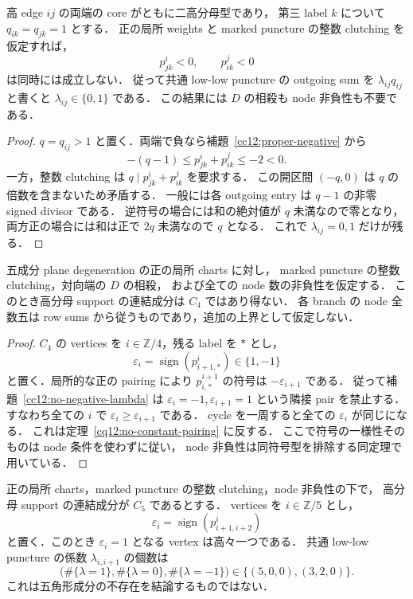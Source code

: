 \begin{lemma}
\label{cc12:no-negative-lambda}
高 edge $ij$ の両端の core がともに二高分母型であり，
第三 label $k$ について $q_{ik}=q_{jk}=1$ とする．
正の局所 weights と marked puncture の整数 clutching を仮定すれば，
\[
 p^i_{jk}<0,\qquad p^j_{ik}<0
\]
は同時には成立しない．
従って共通 low-low puncture の outgoing sum を
$\lambda_{ij}q_{ij}$ と書くと $\lambda_{ij}\in\{0,1\}$ である．
この結果には $D$ の相殺も node 非負性も不要である．
\end{lemma}

\begin{proof}
$q=q_{ij}>1$ と置く．両端で負なら補題~\ref{cc12:proper-negative} から
\[
 -(q-1)\leq p^i_{jk}+p^j_{ik}\leq-2<0.
\]
一方，整数 clutching は $q\mid p^i_{jk}+p^j_{ik}$ を要求する．
この開区間 $(-q,0)$ は $q$ の倍数を含まないため矛盾する．
一般には各 outgoing entry は $q-1$ の非零 signed divisor である．
逆符号の場合には和の絶対値が $q$ 未満なので零となり，
両方正の場合には和は正で $2q$ 未満なので $q$ となる．
これで $\lambda_{ij}=0,1$ だけが残る．
\end{proof}

\begin{theorem}[四角形成分の完全排除]
\label{cc12:no-C4}
五成分 plane degeneration の正の局所 charts に対し，
marked puncture の整数 clutching，対向端の $D$ の相殺，
および全ての node 数の非負性を仮定する．
このとき高分母 support の連結成分は $C_4$ ではあり得ない．
各 branch の node 全数五は row sums から従うものであり，追加の上界として仮定しない．
\end{theorem}

\begin{proof}
$C_4$ の vertices を $i\in\mathbb Z/4$，残る label を $*$ とし，
\[
 \varepsilon_i=\operatorname{sign}(p^i_{i+1,*})\in\{1,-1\}
\]
と置く．局所的な正の pairing により
$p^{i+1}_{i,*}$ の符号は $-\varepsilon_{i+1}$ である．
従って補題~\ref{cc12:no-negative-lambda} は
$\varepsilon_i=-1,\varepsilon_{i+1}=1$ という隣接 pair を禁止する．
すなわち全ての $i$ で $\varepsilon_i\geq\varepsilon_{i+1}$ である．
cycle を一周すると全ての $\varepsilon_i$ が同じになる．
これは定理~\ref{cq12:no-constant-pairing} に反する．
ここで符号の一様性そのものは node 条件を使わずに従い，
node 非負性は同符号型を排除する同定理で用いている．
\end{proof}

\begin{corollary}
\label{cc12:C5-two-types}
正の局所 charts，marked puncture の整数 clutching，node 非負性の下で，
高分母 support の連結成分が $C_5$ であるとする．
vertices を $i\in\mathbb Z/5$ とし，
\[
 \varepsilon_i=\operatorname{sign}(p^i_{i+1,i+2})
\]
と置く．このとき $\varepsilon_i=1$ となる vertex は高々一つである．
共通 low-low puncture の係数 $\lambda_{i,i+1}$ の個数は
\[
 \bigl(\#\{\lambda=1\},\#\{\lambda=0\},\#\{\lambda=-1\}\bigr)
 \in\{(5,0,0),(3,2,0)\}.
\]
これは五角形成分の不存在を結論するものではない．
\end{corollary}

